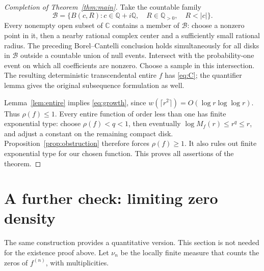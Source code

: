 \documentclass[11pt]{article}
\theoremstyle{remark}
\newcommand{\C}{\mathbb C}
\begin{document}
\begin{proof}[Completion of Theorem~\ref{thm:main}]
Take the countable family
\[
 \mathcal B=\{B(c,R):c\in\mathbb Q+i\mathbb Q,\quad
                    R\in\mathbb Q_{>0},\quad R<|c|\}.
\]
Every nonempty open subset of $\C$ contains a member of $\mathcal B$:
choose a nonzero point in it, then a nearby rational complex center
and a sufficiently small rational radius.
The preceding Borel--Cantelli conclusion holds simultaneously for
all disks in $\mathcal B$ outside a countable union of null events.
Intersect with the probability-one event on which all coefficients
are nonzero. Choose a sample in this intersection.
The resulting deterministic transcendental entire $f$ has
\eqref{eq:C}; the quantifier lemma gives the original subsequence
formulation as well.

Lemma~\ref{lem:entire} implies \eqref{eq:growth}, since
$w(\lceil r^2\rceil)=O(\log r\log\log r)$.
Thus $\rho(f)\leq1$.
Every entire function of order less than one has finite exponential
type: choose $\rho(f)<q<1$, then eventually
$\log M_f(r)\leq r^q\leq r$, and adjust a constant on the remaining
compact disk. Proposition~\ref{prop:obstruction} therefore forces
$\rho(f)\geq1$. It also rules out finite exponential type for our
chosen function. This proves all assertions of the theorem.
\end{proof}

\section{A further check: limiting zero density}

The same construction provides a quantitative version. This section
is not needed for the existence proof above.
Let $\nu_n$ be the locally finite measure that counts the zeros of
$f^{(n)}$, with multiplicities.
\end{document}
